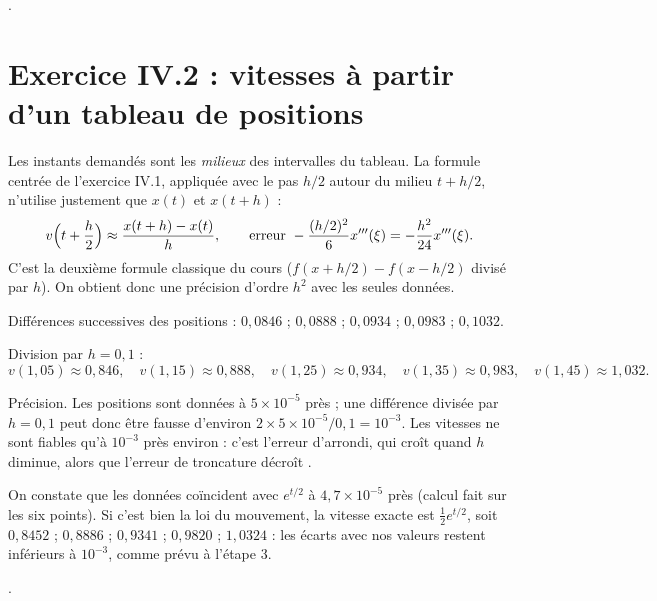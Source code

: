 \Refs {}.

\section{Exercice IV.2 : vitesses à partir d'un tableau de positions}


\Pourquoi Les instants demandés sont les \emph{milieux} des intervalles du
tableau. La formule centrée de l'exercice IV.1, appliquée avec le pas $h/2$
autour du milieu $t + h/2$, n'utilise justement que $x(t)$ et $x(t+h)$ :
\[
  v\Bigl(t + \frac h2\Bigr) \approx \frac{x(t+h) - x(t)}{h},
  \qquad\text{erreur } -\frac{(h/2)^2}{6}x'''(\xi) = -\frac{h^2}{24}x'''(\xi).
\]
C'est la deuxième formule classique du cours ($f(x + h/2) - f(x - h/2)$ divisé
par $h$). On obtient donc une précision d'ordre $h^2$ avec les seules données.

\Etapes
{} Différences successives des positions :
$0{,}0846$ ; $0{,}0888$ ; $0{,}0934$ ; $0{,}0983$ ; $0{,}1032$.

 Division par $h = 0{,}1$ :
\[
  v(1{,}05) \approx 0{,}846, \quad v(1{,}15) \approx 0{,}888, \quad
  v(1{,}25) \approx 0{,}934, \quad v(1{,}35) \approx 0{,}983, \quad
  v(1{,}45) \approx 1{,}032 .
\]

 Précision. Les positions sont données à $5\times 10^{-5}$ près ; une
différence divisée par $h = 0{,}1$ peut donc être fausse d'environ
$2 \times 5\times 10^{-5}/0{,}1 = 10^{-3}$. Les vitesses ne sont fiables qu'à
$10^{-3}$ près environ : c'est l'erreur d'arrondi, qui croît quand $h$ diminue,
alors que l'erreur de troncature décroît .

\Verif On constate que les données coïncident avec $e^{t/2}$ à
$4{,}7\times 10^{-5}$ près (calcul fait sur les six points). Si c'est bien la
loi du mouvement, la vitesse exacte est $\tfrac12e^{t/2}$, soit
$0{,}8452$ ; $0{,}8886$ ; $0{,}9341$ ; $0{,}9820$ ; $1{,}0324$ : les écarts
avec nos valeurs restent inférieurs à $10^{-3}$, comme prévu à l'étape 3.

\Refs {}.

